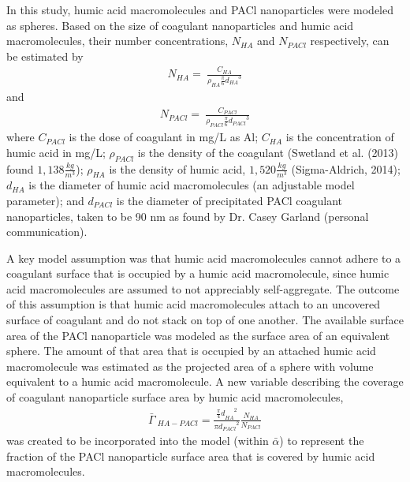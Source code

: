 \documentclass[letterpaper,10pt,english]{sphinxmanual}
\begin{document}
In this study, humic acid macromolecules and PACl nanoparticles were modeled as spheres. Based on the size of coagulant nanoparticles and humic acid macromolecules, their number concentrations, \(N_{HA}\) and \(N_{PACl}\) respectively, can be estimated by
\begin{equation}\label{equation:Flocculation/Floc_Model:Flocculation/Floc_Model:17}
\begin{split}N_{HA}=\ \frac{C_{HA}}{{\rho }_{HA}\frac{\pi }{6}{d_{HA}}^3}\end{split}
\end{equation}
and
\begin{equation}\label{equation:Flocculation/Floc_Model:Flocculation/Floc_Model:18}
\begin{split}N_{PACl}=\ \frac{C_{PACl}}{{\rho }_{PACl}\frac{\pi }{6}{d_{PACl}}^3}\end{split}
\end{equation}
where \(C_{PACl}\) is the dose of coagulant in mg/L as Al; \(C_{HA}\) is the concentration of humic acid in mg/L; \({\rho }_{PACl}\) is the density of the coagulant (Swetland et al. (2013) found \(1,138 \frac{kg}{m^3}\)); \({\rho }_{HA}\) is the density of humic acid, \(1,520\frac{kg}{m^3}\) (Sigma-Aldrich, 2014); \(d_{HA}\) is the diameter of humic acid macromolecules (an adjustable model parameter); and \(d_{PACl}\) is the diameter of precipitated PACl coagulant nanoparticles, taken to be 90 nm as found by Dr. Casey Garland (personal communication).

A key model assumption was that humic acid macromolecules cannot adhere to a coagulant surface that is occupied by a humic acid macromolecule, since humic acid macromolecules are assumed to not appreciably self-aggregate. The outcome of this assumption is that humic acid macromolecules attach to an uncovered surface of coagulant and do not stack on top of one another. The available surface area of the PACl nanoparticle was modeled as the surface area of an equivalent sphere. The amount of that area that is occupied by an attached humic acid macromolecule was estimated as the projected area of a sphere with volume equivalent to a humic acid macromolecule.  A new variable describing the coverage of coagulant nanoparticle surface area by humic acid macromolecules,
\begin{equation}\label{equation:Flocculation/Floc_Model:eq_Gamma_HA-PACl}
\begin{split}{\bar{\Gamma}\mathrm{\ }}_{HA-PACl}=\frac{{{\frac{\pi }{4}d}_{HA}}^2}{{{\pi d}_{PACl}}^2}\frac{N_{HA}}{N_{PACl}}\end{split}
\end{equation}
was created to be incorporated into the model (within \(\bar{\alpha }\)) to represent the fraction of the PACl nanoparticle surface area that is covered by humic acid macromolecules.
\end{document}
